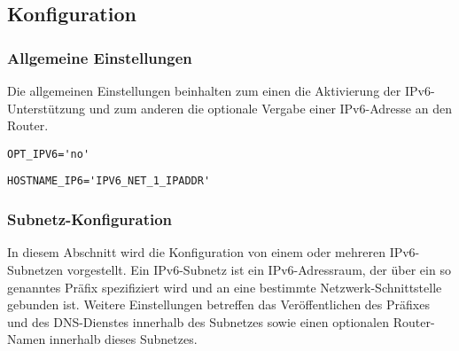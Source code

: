 \subsection{Konfiguration}

\subsubsection{Allgemeine Einstellungen}

Die allgemeinen Einstellungen beinhalten zum einen die Aktivierung der
IPv6-Unterstützung und zum anderen die optionale Vergabe einer IPv6-Adresse an
den Router.

\begin{description}
\verb*?OPT_IPV6='no'?

\verb*?HOSTNAME_IP6='IPV6_NET_1_IPADDR'?
\end{description}

\subsubsection{Subnetz-Konfiguration}

In diesem Abschnitt wird die Konfiguration von einem oder mehreren
IPv6-Subnetzen vorgestellt. Ein IPv6-Subnetz ist ein IPv6-Adressraum, der über
ein so genanntes Präfix spezifiziert wird und an eine bestimmte
Netzwerk-Schnittstelle gebunden ist. Weitere Einstellungen betreffen das
Veröffentlichen des Präfixes und des DNS-Dienstes innerhalb des Subnetzes
sowie einen optionalen Router-Namen innerhalb dieses Subnetzes.

